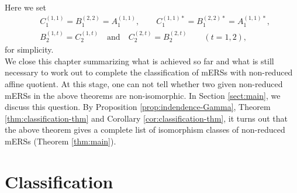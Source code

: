 \documentclass[11pt]{amsart}
\begin{document}
Here we set 
\begin{align*}
&C_1^{(1,1)}=B_1^{(2,2)}=A_1^{(1,1)}, \qquad C_1^{(1,1)\ast}=B_1^{(2,2)\ast}=A_1^{(1,1)\ast}, \\
&B_2^{(1,t)}=C_2^{(1,t)} \quad \text{and} \quad C_2^{(2,t)}=B_2^{(2,t)} \qquad (t=1,2),
\end{align*}
for simplicity.\\

We close this chapter summarizing what is achieved so far and what is still necessary to work out to complete the classification of mERSs with non-reduced 
affine quotient. 
At this stage, one can not tell whether two given non-reduced mERSs in the above theorems are non-isomorphic. 
In Section \ref{sect:main}, we discuss this question.
By Proposition \ref{prop:indendence-Gamma}, Theorem \ref{thm:classification-thm} and Corollary \ref{cor:classification-thm}, 
it turns out that the above theorem gives a complete list of isomorphism classes of non-reduced mERSs (Theorem \ref{thm:main}).  





\part{Classification}\label{chapter:classification}
\end{document}
